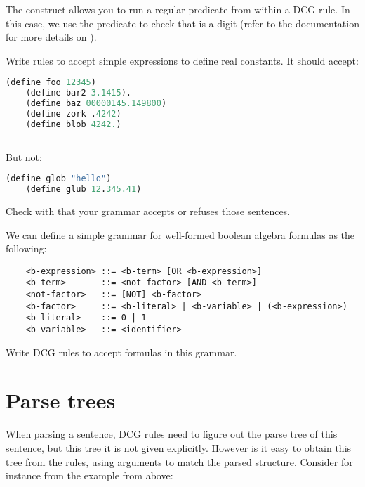 \documentclass{../../../tp}
\begin{document}
The  construct allows you to run a regular \prolog predicate from within a DCG rule. In this case, we use the  predicate to check that  is a digit (refer to the documentation for more details on ).

\begin{instruction}
	Write rules to accept simple \scheme expressions to define real constants. It should accept:
	
	\begin{lstlisting}[language=lisp]
	(define foo 12345)
	(define bar2 3.1415).
	(define baz 00000145.149800)
	(define zork .4242)
	(define blob 4242.)
	
	\end{lstlisting}
	
	But not: 
	
	\begin{lstlisting}[language=lisp]
	(define glob "hello")
	(define glub 12.345.41)
	\end{lstlisting}
	
	Check with  that your grammar accepts or refuses those sentences.
\end{instruction}  




\begin{instruction}
	We can define a simple grammar for well-formed boolean algebra formulas as the following:
	
	\begin{verbatim}
	<b-expression> ::= <b-term> [OR <b-expression>]
	<b-term>       ::= <not-factor> [AND <b-term>]
	<not-factor>   ::= [NOT] <b-factor>
	<b-factor>     ::= <b-literal> | <b-variable> | (<b-expression>)
	<b-literal>    ::= 0 | 1
	<b-variable>   ::= <identifier>
	\end{verbatim}
	
	Write DCG rules to accept formulas in this grammar. 
\end{instruction}


\section{Parse trees}

When parsing a sentence, DCG rules need to figure out the parse tree of this sentence, but this tree it is not given explicitly. However is it easy to obtain this tree from the rules, using arguments to match the parsed structure. Consider for instance from the example from above:
\end{document}
